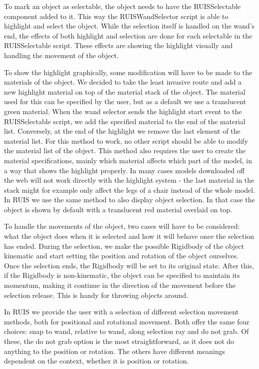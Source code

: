 \documentclass[12pt,a4paper,oneside,pdftex]{report}
\begin{document}
To mark an object as selectable, the object needs to have the RUISSelectable component added to it. This way the RUISWandSelector script is able to highlight and select the object. While the selection itself is handled on the wand's end, the effects of both highlight and selection are done for each selectable in the RUISSelectable script. These effects are showing the highlight visually and handling the movement of the object. 

To show the highlight graphically, some modification will have to be made to the materials of the object. We decided to take the least invasive route and add a new highlight material on top of the material stack of the object. The material used for this can be specified by the user, but as a default we use a translucent green material. When the wand selector sends the highlight start event to the RUISSelectable script, we add the specified material to the end of the material list. Conversely, at the end of the highlight we remove the last element of the material list. For this method to work, no other script should be able to modify the material list of the object. This method also requires the user to create the material specifications, mainly which material affects which part of the model, in a way that shows the highlight properly. In many cases models downloaded off the web will not work directly with the highlight system - the last material in the stack might for example only affect the legs of a chair instead of the whole model. In RUIS we use the same method to also display object selection. In that case the object is shown by default with a translucent red material overlaid on top.

To handle the movements of the object, two cases will have to be considered: what the object does when it is selected and how it will behave once the selection has ended. During the selection, we make the possible Rigidbody of the object kinematic and start setting the position and rotation of the object ourselves. Once the selection ends, the Rigidbody will be set to its original state. After this, if the Rigidbody is non-kinematic, the object can be specified to maintain its momentum, making it continue in the direction of the movement before the selection release. This is handy for throwing objects around.

In RUIS we provide the user with a selection of different selection movement methods, both for positional and rotational movement. Both offer the same four choices: snap to wand, relative to wand, along selection ray and do not grab. Of these, the do not grab option is the most straightforward, as it does not do anything to the position or rotation. The others have different meanings dependent on the context, whether it is position or rotation.
\end{document}
